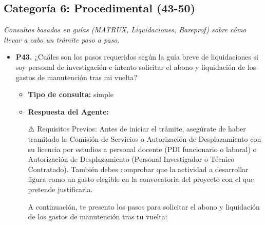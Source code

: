 \documentclass{article}
\begin{document}
\subsection{Categoría 6: Procedimental (43-50)}
\textit{Consultas basadas en guías (MATRUX, Liquidaciones, Bareprof) sobre cómo llevar a cabo un trámite paso a paso.}
\begin{itemize}
  \item \textbf{P43.} ¿Cuáles son los pasos requeridos según la guía breve de liquidaciones si soy personal de investigación e intento solicitar el abono y liquidación de los gastos de manutención tras mi vuelta? \\
        \begin{itemize}
          \item \textbf{Tipo de consulta:} simple
          \item \textbf{Respuesta del Agente:}

                ⚠️ Requisitos Previos:
                Antes de iniciar el trámite, asegúrate de haber tramitado la Comisión de Servicios o Autorización de Desplazamiento con su licencia por estudios a personal docente (PDI funcionario o laboral) o Autorización de Desplazamiento (Personal Investigador o Técnico Contratado). También debes comprobar que la actividad a desarrollar figura como un gasto elegible en la convocatoria del proyecto con el que pretende justificarla.

                A continuación, te presento los pasos para solicitar el abono y liquidación de los gastos de manutención tras tu vuelta:


\end{itemize}
\end{itemize}
\end{document}
